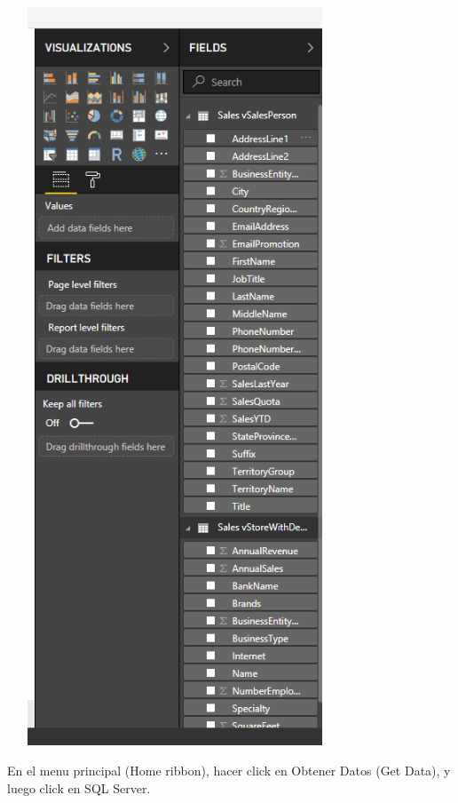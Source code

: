 \documentclass[12pt,letterpaper]{article}
\begin{document}
\begin{center}
    \includegraphics[width=10cm,height=22cm]{img/11.png}  
\end{center}
En el menu principal (Home ribbon), hacer click en Obtener Datos (Get Data), y luego click en SQL Server.
\end{document}
